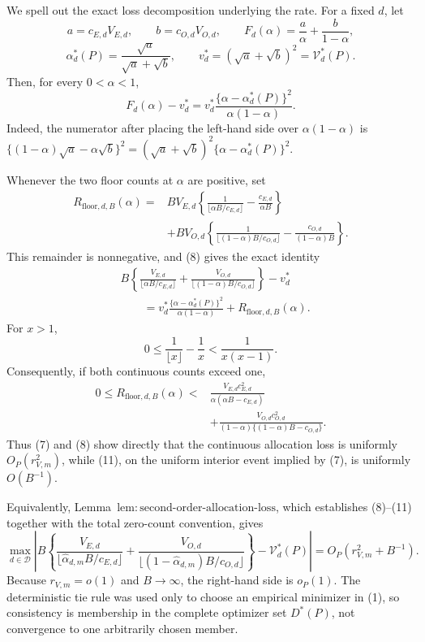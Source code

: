 We spell out the exact loss decomposition underlying the rate.  For a fixed \(d\), let
\[
 a=c_{E,d}V_{E,d},\qquad b=c_{O,d}V_{O,d},
 \qquad
 F_d(\alpha)=\frac a\alpha+\frac b{1-\alpha},
\]
\[
 \alpha_d^*(P)=\frac{\sqrt a}{\sqrt a+\sqrt b},
 \qquad
 v_d^*=(\sqrt a+\sqrt b)^2=\mathcal V_d^*(P).
\]
Then, for every \(0<\alpha<1\),
\[
 F_d(\alpha)-v_d^*
 =v_d^*\frac{\{\alpha-\alpha_d^*(P)\}^2}{\alpha(1-\alpha)}.       \tag{8}
\]
Indeed, the numerator after placing the left-hand side over \(\alpha(1-\alpha)\) is
\(\{(1-\alpha)\sqrt a-\alpha\sqrt b\}^2
=(\sqrt a+\sqrt b)^2\{\alpha-\alpha_d^*(P)\}^2\).

Whenever the two floor counts at \(\alpha\) are positive, set
\[
\begin{aligned}
 R_{\mathrm{floor},d,B}(\alpha)
 ={}&B V_{E,d}\left\{
 \frac1{\lfloor\alpha B/c_{E,d}\rfloor}
 -\frac{c_{E,d}}{\alpha B}\right\}\\
 &+B V_{O,d}\left\{
 \frac1{\lfloor(1-\alpha)B/c_{O,d}\rfloor}
 -\frac{c_{O,d}}{(1-\alpha)B}\right\}.
\end{aligned}                                                       \tag{9}
\]
This remainder is nonnegative, and (8) gives the exact identity
\[
\begin{aligned}
 &B\left\{
 \frac{V_{E,d}}{\lfloor\alpha B/c_{E,d}\rfloor}
 +\frac{V_{O,d}}{\lfloor(1-\alpha)B/c_{O,d}\rfloor}
 \right\}-v_d^*\\
 &\qquad={}
 v_d^*\frac{\{\alpha-\alpha_d^*(P)\}^2}{\alpha(1-\alpha)}
 +R_{\mathrm{floor},d,B}(\alpha).                                 \tag{10}
\end{aligned}
\]
For \(x>1\),
\[
 0\le\frac1{\lfloor x\rfloor}-\frac1x
 <\frac1{x(x-1)}.
\]
Consequently, if both continuous counts exceed one,
\[
\begin{aligned}
 0\le R_{\mathrm{floor},d,B}(\alpha)
 <{}&\frac{V_{E,d}c_{E,d}^2}
 {\alpha(\alpha B-c_{E,d})}\\
 &+\frac{V_{O,d}c_{O,d}^2}
 {(1-\alpha)\{(1-\alpha)B-c_{O,d}\}}.                            \tag{11}
\end{aligned}
\]
Thus (7) and (8) show directly that the continuous allocation loss is uniformly \(O_P(r_{V,m}^2)\), while (11), on the uniform interior event implied by (7), is uniformly \(O(B^{-1})\).

Equivalently, Lemma~\(\mathrm{lem{:}second\text{-}order\text{-}allocation\text{-}loss}\), which establishes (8)--(11) together with the total zero-count convention, gives
\[
\max_{d\in\mathcal D}\left|B\left\{
\frac{V_{E,d}}{\lfloor\widehat\alpha_{d,m}B/c_{E,d}\rfloor}
+\frac{V_{O,d}}{\lfloor(1-\widehat\alpha_{d,m})B/c_{O,d}\rfloor}
\right\}-\mathcal V_d^*(P)\right|
=O_P(r_{V,m}^2+B^{-1}).                                            \tag{12}
\]
Because \(r_{V,m}=o(1)\) and \(B\to\infty\), the right-hand side is \(o_P(1)\).  The deterministic tie rule was used only to choose an empirical minimizer in (1), so consistency is membership in the complete optimizer set \(D^*(P)\), not convergence to one arbitrarily chosen member.